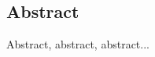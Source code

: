 \documentclass[a4paper, 11pt, twoside]{report}
\begin{document}
\begin{center}
\section*{Abstract}
Abstract, abstract, abstract...







\end{center}
\end{document}
